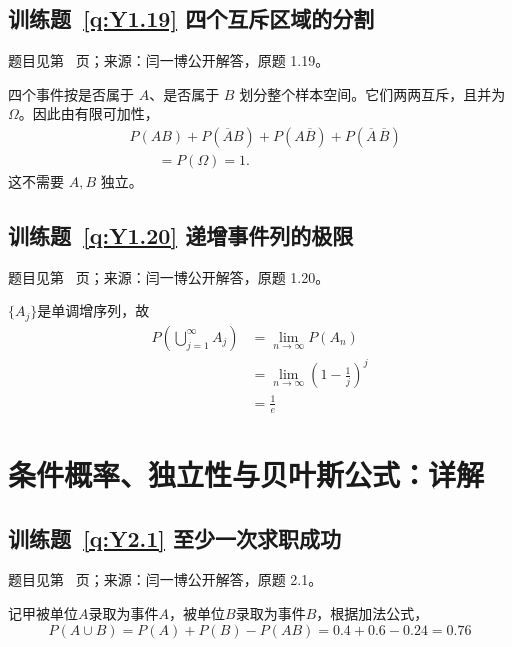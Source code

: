 \subsection*{训练题~\ref{q:Y1.19} 四个互斥区域的分割}\label{a:Y1.19}{\small 题目见第~\pageref{q:Y1.19} 页；来源：闫一博公开解答，原题 1.19。}
\begin{solve}四个事件按是否属于 $A$、是否属于 $B$ 划分整个样本空间。它们两两互斥，且并为 $\Omega$。因此由有限可加性，\[\begin{aligned}&P(AB)+P(\overline AB)+P(A\overline B)+P(\overline A\,\overline B)\\&\qquad=P(\Omega)=1.\end{aligned}\]这不需要 $A,B$ 独立。\end{solve}

\subsection*{训练题~\ref{q:Y1.20} 递增事件列的极限}\label{a:Y1.20}{\small 题目见第~\pageref{q:Y1.20} 页；来源：闫一博公开解答，原题 1.20。}
\begin{solve}
$\{A_j\}$是单调增序列，故
\[\begin{aligned}
P(\bigcup\limits_{j = 1}^\infty  {{A_j}} ) &= \mathop {\lim }\limits_{n \to \infty } P({A_n}) \\&= \mathop {\lim }\limits_{n \to \infty } {(1 - \frac{1}{j})^j} \\&= \frac{1}{e}
\end{aligned}\]
\end{solve}

\clearpage\section*{条件概率、独立性与贝叶斯公式：详解}

\subsection*{训练题~\ref{q:Y2.1} 至少一次求职成功}\label{a:Y2.1}{\small 题目见第~\pageref{q:Y2.1} 页；来源：闫一博公开解答，原题 2.1。}
\begin{solve}
记甲被单位$A$录取为事件$A$，被单位$B$录取为事件$B$，根据加法公式，
\[P(A \cup B) = P(A) + P(B) - P(AB) = 0.4 + 0.6 - 0.24 = 0.76\]
\end{solve}

